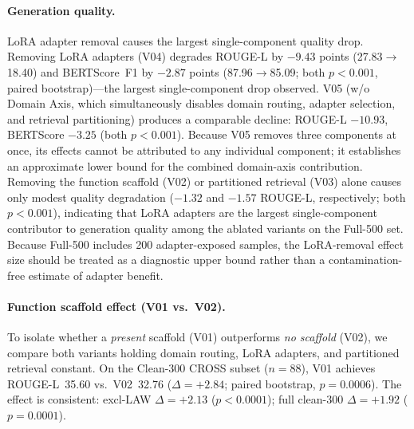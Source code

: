 \documentclass[a4paper,fleql,doubleblind]{cas-sc}
\begin{document}
\paragraph{Generation quality.}
LoRA adapter removal causes the largest single-component quality drop.
Removing LoRA adapters (V04) degrades ROUGE-L by $-9.43$ points
(27.83$\to$18.40) and BERTScore~F1 by $-2.87$ points (87.96$\to$85.09;
both $p{<}0.001$, paired bootstrap)---the largest single-component drop observed.
V05 (w/o Domain Axis, which simultaneously disables domain routing, adapter
selection, and retrieval partitioning) produces a comparable decline:
ROUGE-L $-10.93$, BERTScore $-3.25$ (both $p{<}0.001$).
Because V05 removes three components at once, its effects cannot be attributed to
any individual component; it establishes an approximate lower bound for the combined
domain-axis contribution.
Removing the function scaffold (V02) or partitioned retrieval (V03) alone causes
only modest quality degradation ($-1.32$ and $-1.57$ ROUGE-L, respectively;
both $p{<}0.001$), indicating that LoRA adapters are the largest single-component
contributor to generation quality among the ablated variants on the Full-500 set.
Because Full-500 includes 200 adapter-exposed samples, the LoRA-removal effect size
should be treated as a diagnostic upper bound rather than a contamination-free estimate
of adapter benefit.

\paragraph{Function scaffold effect (V01 vs.\ V02).}
To isolate whether a \emph{present} scaffold (V01) outperforms \emph{no scaffold}
(V02), we compare both variants holding domain routing, LoRA adapters, and
partitioned retrieval constant.
On the Clean-300 CROSS subset ($n{=}88$), V01 achieves ROUGE-L~35.60 vs.\
V02~32.76 ($\Delta{=}{+2.84}$; paired bootstrap, $p{=}0.0006$).
The effect is consistent: excl-LAW $\Delta{=}{+2.13}$ ($p{<}0.0001$);
full clean-300 $\Delta{=}{+1.92}$ ($p{=}0.0001$).
\end{document}

